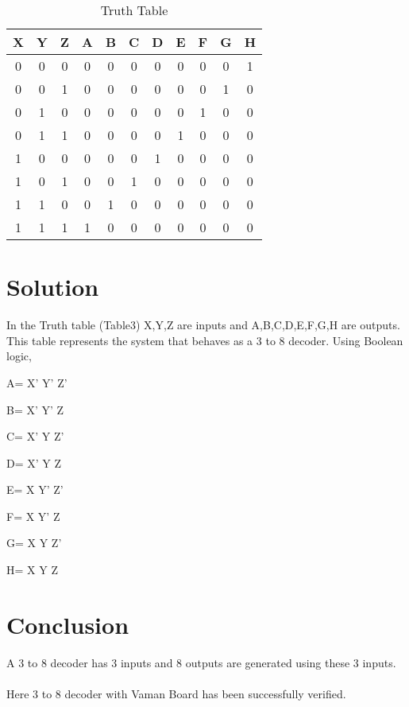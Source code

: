 \documentclass[journal,12pt,twocolumn]{IEEEtran}
\begin{document}
    \begin{table}[h]
    \centering
    \begin{tabular}{| c | c | c || c | c | c | c | c | c | c | c |}
    \hline
    \textbf{X} & \textbf{Y} & \textbf{Z} & \textbf{A} & \textbf{B} & \textbf{C} & \textbf{D} & \textbf{E} & \textbf{F} & \textbf{G} & \textbf{H} \\
    \hline
    0 & 0 & 0 & 0 & 0 & 0 & 0 & 0 & 0 & 0 & 1  \\
    \hline
    0 & 0 & 1 & 0 & 0 & 0 & 0 & 0 & 0 & 1 & 0  \\
    \hline
    0 & 1 & 0 & 0 & 0 & 0 & 0 & 0 & 1 & 0 & 0  \\
    \hline
    0 & 1 & 1 & 0 & 0 & 0 & 0 & 1 & 0 & 0 & 0  \\
    \hline
    1 & 0 & 0 & 0 & 0 & 0 & 1 & 0 & 0 & 0 & 0  \\
    \hline
    1 & 0 & 1 & 0 & 0 & 1 & 0 & 0 & 0 & 0 & 0  \\
    \hline
    1 & 1 & 0 & 0 & 1 & 0 & 0 & 0 & 0 & 0 & 0  \\
    \hline
    1 & 1 & 1 & 1 & 0 & 0 & 0 & 0 & 0 & 0 & 0  \\
    \hline
    \end{tabular}
    \caption{Truth Table}
    \label{tab:my_label}
 \end{table}
\section{Solution}

In the Truth table (Table3) X,Y,Z are inputs and A,B,C,D,E,F,G,H are outputs. This table represents the system that behaves as a 3 to 8 decoder. Using Boolean logic, \\
 \begin{center}
     A= X' Y' Z'\\
 \end{center}
  \begin{center}
      B= X' Y' Z\\
 \end{center}
  \begin{center}
      C= X' Y Z'\\
 \end{center}
  \begin{center}
      D= X' Y Z\\
 \end{center}
  \begin{center}
     E= X Y' Z'\\
 \end{center}
  \begin{center}
     F= X Y' Z\\
 \end{center}
  \begin{center}
     G= X Y Z'\\
 \end{center}
  \begin{center}
     H= X Y Z\\
 \end{center} 
 \section{Conclusion}
 A 3 to 8 decoder has 3 inputs and 8 outputs are generated using these 3 inputs.\\
 \\
  Here 3 to 8 decoder with Vaman Board has been successfully verified.\\
\end{document}
